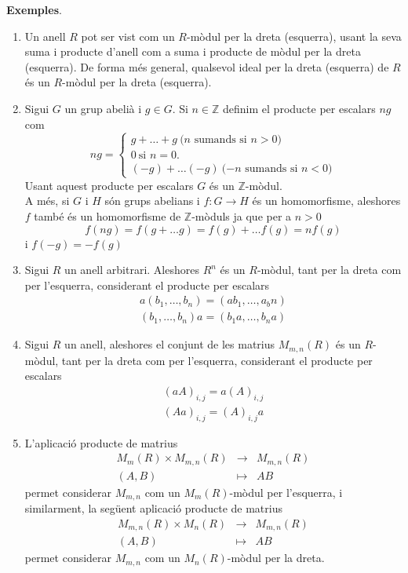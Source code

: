 \textbf{Exemples}. \begin{enumerate}[(1)]
\item Un anell $R$ pot ser vist com un $R$-mòdul per la dreta (esquerra), usant la seva suma i producte d'anell com a suma i producte de mòdul per la dreta (esquerra). De forma més general, qualsevol ideal per la dreta (esquerra) de $R$ és un $R$-mòdul per la dreta (esquerra).
\item Sigui $G$ un grup abelià i $g\in G$. Si $n\in \mathbb{Z}$ definim el producte per escalars $ng$ com
$$
ng=\begin{cases}
g+\dots + g  \  \text{($n$ sumands si $n>0$)} \\
0 \ \text{si $n=0$.}\\
(-g)+\dots (-g) \  \text{($-n$ sumands si $n<0$)}
\end{cases}
$$
Usant aquest producte per escalars $G$ és un $\mathbb{Z}$-mòdul. \\
A més, si $G$ i $H$ són grups abelians i $f:G\rightarrow H$ és un homomorfisme, aleshores $f$ també és un homomorfisme de $\mathbb{Z}$-mòduls ja que per a $n>0$
$$
f(ng)=f(g+\dots g)=f(g)+\dots f(g)=nf(g)
$$
i $f(-g)=-f(g)$


\item Sigui $R$ un anell arbitrari. Aleshores $R^n$ és un $R$-mòdul, tant per la dreta com per l'esquerra, considerant el producte per escalars
\begin{eqnarray*}
a(b_1,\dots ,b_n)=(ab_1 , \dots , a_bn) \\
(b_1,\dots ,b_n)a=(b_1 a, \dots , b_n a)
\end{eqnarray*}
\item Sigui $R$ un anell, aleshores el conjunt de les matrius $M_{m,n}(R)$ és un $R$-mòdul, tant per la dreta com per l'esquerra, considerant el producte per escalars
\begin{eqnarray*}
(aA)_{i,j}=a(A)_{i,j} \\
(Aa)_{i,j}=(A)_{i,j}a
\end{eqnarray*}
\item L'aplicació producte de matrius
\begin{eqnarray*}
M_m(R) \times M_{m,n}(R)& \rightarrow  &M_{m,n}(R)\\
(A,B)&\mapsto & AB
\end{eqnarray*}
permet considerar $M_{m,n}$ com un $M_m(R)$-mòdul per l'esquerra, i similarment, la següent aplicació producte de matrius
\begin{eqnarray*}
M_{m,n}(R) \times M_{n}(R)& \rightarrow  &M_{m,n}(R)\\
(A,B)&\mapsto & AB
\end{eqnarray*}
permet considerar $M_{m,n}$ com un $M_n(R)$-mòdul per la dreta.


\end{enumerate}
